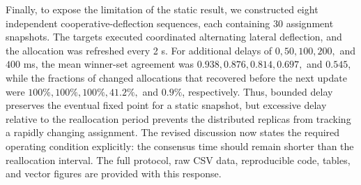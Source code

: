 Finally, to expose the limitation of the static result, we constructed eight
independent cooperative-deflection sequences, each containing 30 assignment
snapshots. The targets executed coordinated alternating lateral deflection, and
the allocation was refreshed every 2 s. For additional delays of
$0,50,100,200,$ and $400$ ms, the mean winner-set agreement was
$0.938,0.876,0.814,0.697,$ and $0.545$, while the fractions of changed
allocations that recovered before the next update were
$100\%,100\%,100\%,41.2\%,$ and $0.9\%$, respectively. Thus, bounded delay
preserves the eventual fixed point for a static snapshot, but excessive delay
relative to the reallocation period prevents the distributed replicas from
tracking a rapidly changing assignment. The revised discussion now states the
required operating condition explicitly: the consensus time should remain
shorter than the reallocation interval. The full protocol, raw CSV data,
reproducible code, tables, and vector figures are provided with this response.

